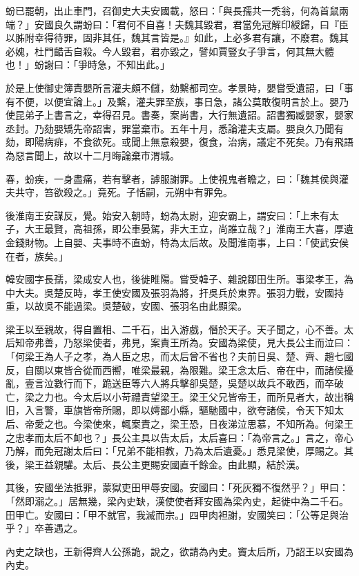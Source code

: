 \begin{pinyinscope}
蚡已罷朝，出止車門，召御史大夫安國載，怒曰：「與長孺共一禿翁，何為首鼠兩端？」安國良久謂蚡曰：「君何不自喜！夫魏其毀君，君當免冠解印綬歸，曰『臣以胏附幸得待罪，固非其任，魏其言皆是。』如此，上必多君有讓，不廢君。魏其必媿，杜門齰舌自殺。今人毀君，君亦毀之，譬如賈豎女子爭言，何其無大體也！」蚡謝曰：「爭時急，不知出此。」

於是上使御史簿責嬰所言灌夫頗不讎，劾繫都司空。孝景時，嬰嘗受遺詔，曰「事有不便，以便宜論上。」及繫，灌夫罪至族，事日急，諸公莫敢復明言於上。嬰乃使昆弟子上書言之，幸得召見。書奏，案尚書，大行無遺詔。詔書獨臧嬰家，嬰家丞封。乃劾嬰矯先帝詔害，罪當棄市。五年十月，悉論灌夫支屬。嬰良久乃聞有劾，即陽病痱，不食欲死。或聞上無意殺嬰，復食，治病，議定不死矣。乃有飛語為惡言聞上，故以十二月晦論棄市渭城。

春，蚡疾，一身盡痛，若有擊者，謼服謝罪。上使視鬼者瞻之，曰：「魏其侯與灌夫共守，笞欲殺之。」竟死。子恬嗣，元朔中有罪免。

後淮南王安謀反，覺。始安入朝時，蚡為太尉，迎安霸上，謂安曰：「上未有太子，大王最賢，高祖孫，即公車晏駕，非大王立，尚誰立哉？」淮南王大喜，厚遺金錢財物。上自嬰、夫事時不直蚡，特為太后故。及聞淮南事，上曰：「使武安侯在者，族矣。」

韓安國字長孺，梁成安人也，後徙睢陽。嘗受韓子、雜說鄒田生所。事梁孝王，為中大夫。吳楚反時，孝王使安國及張羽為將，扞吳兵於東界。張羽力戰，安國持重，以故吳不能過梁。吳楚破，安國、張羽名由此顯梁。

梁王以至親故，得自置相、二千石，出入游戲，僭於天子。天子聞之，心不善。太后知帝弗善，乃怒梁使者，弗見，案責王所為。安國為梁使，見大長公主而泣曰：「何梁王為人子之孝，為人臣之忠，而太后曾不省也？夫前日吳、楚、齊、趙七國反，自關以東皆合從而西嚮，唯梁最親，為限難。梁王念太后、帝在中，而諸侯擾亂，壹言泣數行而下，跪送臣等六人將兵擊卻吳楚，吳楚以故兵不敢西，而卒破亡，梁之力也。今太后以小苛禮責望梁王。梁王父兄皆帝王，而所見者大，故出稱旧，入言警，車旗皆帝所賜，即以嫮鄙小縣，驅馳國中，欲夸諸侯，令天下知太后、帝愛之也。今梁使來，輒案責之，梁王恐，日夜涕泣思慕，不知所為。何梁王之忠孝而太后不卹也？」長公主具以告太后，太后喜曰：「為帝言之。」言之，帝心乃解，而免冠謝太后曰：「兄弟不能相教，乃為太后遺憂。」悉見梁使，厚賜之。其後，梁王益親驩。太后、長公主更賜安國直千餘金。由此顯，結於漢。

其後，安國坐法抵罪，蒙獄吏田甲辱安國。安國曰：「死灰獨不復然乎？」甲曰：「然即溺之。」居無幾，梁內史缺，漢使使者拜安國為梁內史，起徙中為二千石。田甲亡。安國曰：「甲不就官，我滅而宗。」四甲肉袒謝，安國笑曰：「公等足與治乎？」卒善遇之。

內史之缺也，王新得齊人公孫詭，說之，欲請為內史。竇太后所，乃詔王以安國為內史。


\end{pinyinscope}

